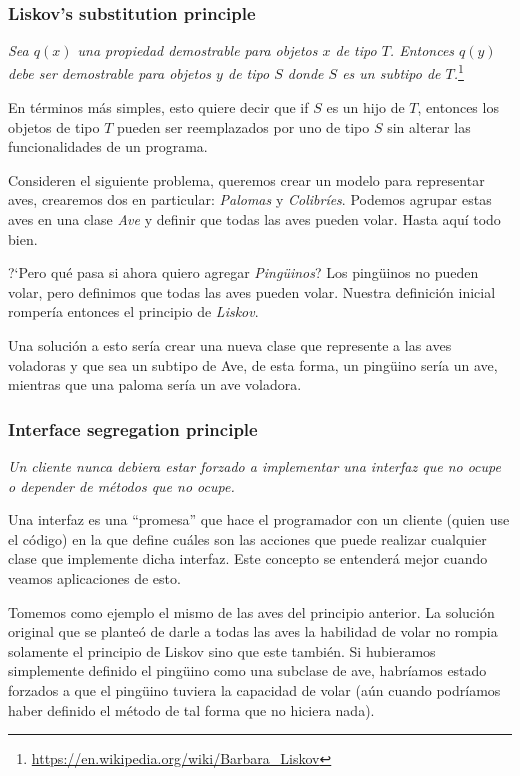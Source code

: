       \subsubsection{Liskov's substitution principle}
        \textit{Sea \(q(x)\) una propiedad demostrable para objetos \(x\) de tipo \(T\). 
        Entonces \(q(y)\) debe ser demostrable para objetos \(y\) de tipo \(S\) donde \(S\)
        es un subtipo de \(T\).}\footnote{
          \url{https://en.wikipedia.org/wiki/Barbara_Liskov}
        }

        En términos más simples, esto quiere decir que if \(S\) es un hijo de \(T\), entonces los 
        objetos de tipo \(T\) pueden ser reemplazados por uno de tipo \(S\) sin alterar las 
        funcionalidades de un programa.

        Consideren el siguiente problema, queremos crear un modelo para representar aves,
        crearemos dos en particular: \textit{Palomas} y \textit{Colibríes}.
        Podemos agrupar estas aves en una clase \textit{Ave} y definir que todas las aves
        pueden volar.
        Hasta aquí todo bien.

        ?`Pero qué pasa si ahora quiero agregar \textit{Pingüinos}?
        Los pingüinos no pueden volar, pero definimos que todas las aves pueden volar. 
        Nuestra definición inicial rompería entonces el principio de \textit{Liskov}.

        Una solución a esto sería crear una nueva clase que represente a las aves 
        voladoras y que sea un subtipo de Ave, de esta forma, un pingüino sería un ave, 
        mientras que una paloma sería un ave voladora.

      \subsubsection{Interface segregation principle}
        \textit{Un cliente nunca debiera estar forzado a implementar una interfaz que no 
        ocupe o depender de métodos que no ocupe.}

        Una interfaz es una ``promesa'' que hace el programador con un cliente (quien use 
        el código) en la que define cuáles son las acciones que puede realizar cualquier 
        clase que implemente dicha interfaz.
        Este concepto se entenderá mejor cuando veamos aplicaciones de esto.

        Tomemos como ejemplo el mismo de las aves del principio anterior.
        La solución original que se planteó de darle a todas las aves la habilidad de 
        volar no rompia solamente el principio de Liskov sino que este también.
        Si hubieramos simplemente definido el pingüino como una subclase de ave, habríamos
        estado forzados a que el pingüino tuviera la capacidad de volar (aún cuando 
        podríamos haber definido el método de tal forma que no hiciera nada).


